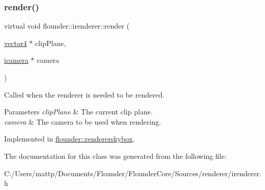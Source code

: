 \subsubsection{\texorpdfstring{render()}{render()}}
{\footnotesize\ttfamily virtual void flounder\+::irenderer\+::render (\begin{DoxyParamCaption}\item[{\hyperlink{classflounder_1_1vector4}{vector4} $\ast$}]{clip\+Plane,  }\item[{\hyperlink{classflounder_1_1icamera}{icamera} $\ast$}]{camera }\end{DoxyParamCaption})\hspace{0.3cm}{\ttfamily [pure virtual]}}



Called when the renderer is needed to be rendered. 


\begin{DoxyParams}{Parameters}
{\em clip\+Plane} & The current clip plane. \\
\hline
{\em camera} & The camera to be used when rendering. \\
\hline
\end{DoxyParams}


Implemented in \hyperlink{classflounder_1_1rendererskybox_a3903974ac1a1e2af5b5a8fcbfe8ea433}{flounder\+::rendererskybox}.



The documentation for this class was generated from the following file\+:\begin{DoxyCompactItemize}
\item 
C\+:/\+Users/mattp/\+Documents/\+Flounder/\+Flounder\+Core/\+Sources/renderer/irenderer.\+h\end{DoxyCompactItemize}

